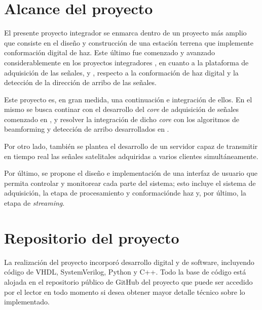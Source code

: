 \documentclass[../../main.tex]{subfiles}
\begin{document}

\section{Alcance del proyecto}
El presente proyecto integrador se enmarca dentro de un proyecto más amplio que consiste en el diseño y construcción de una estación terrena que implemente conformación digital de haz. Este último fue comenzado y avanzado considerablemente en los proyectos integradores \cite{proyecto-jose}, en cuanto a la plataforma de adquisición de las señales, y \cite{proyecto-grigo}, respecto a la conformación de haz digital y la detección de la dirección de arribo de las señales. 

Este proyecto es, en gran medida, una continuación e integración de ellos. En el mismo se busca continar con el desarrollo del \textit{core} de adquisición de señales comenzado en \cite{proyecto-jose}, y resolver la integración de dicho \textit{core} con los algoritmos de beamforming y detección de arribo desarrollados en \cite{proyecto-grigo}.

Por otro lado, también se plantea el desarrollo de un servidor capaz de transmitir en tiempo real las señales satelitales adquiridas a varios clientes simultáneamente.

Por último, se propone el diseño e implementación de una interfaz de usuario que permita controlar y monitorear cada parte del sistema; esto incluye el sistema de adquisición, la etapa de procesamiento y conformaciónde haz y, por último, la etapa de \textit{streaming}.

\section{Repositorio del proyecto}
La realización del proyecto incorporó desarrollo digital y de software, incluyendo código de VHDL, SystemVerilog, Python y C++. Todo la base de código está alojada en el repositorio público de GitHub del proyecto \cite{github} que puede ser accedido por el lector en todo momento si desea obtener mayor detalle técnico sobre lo implementado.
\end{document}
